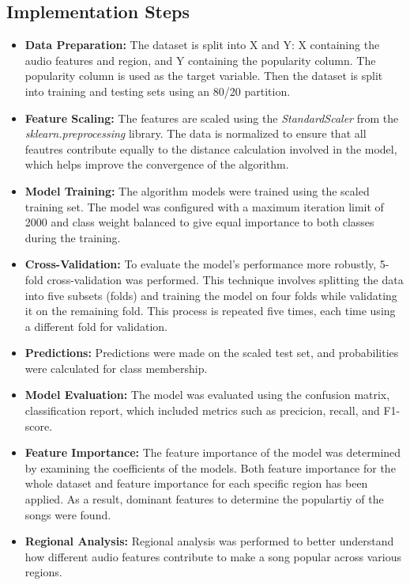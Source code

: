 \subsection{Implementation Steps}
\begin{itemize}
    \item \textbf{Data Preparation: } The dataset is split into X and Y: X containing the audio features and region, and Y containing the popularity column.
    The popularity column is used as the target variable. Then the dataset is split into training and testing sets using an 80/20 partition.
    \item \textbf{Feature Scaling: } The features are scaled using the \textit{StandardScaler} from the \textit{sklearn.preprocessing} library. The data is normalized to ensure that all feautres contribute equally to the distance calculation involved in the model, which helps improve the convergence of the algorithm.
  
    \item \textbf{Model Training: } The algorithm models were trained using the scaled training set. The model was
    configured with a maximum iteration limit of 2000 and class weight balanced to give equal importance to both classes during the training.
    \item \textbf{Cross-Validation: } To evaluate the model's performance more robustly, 5-fold cross-validation was performed.
    This technique involves splitting the data into five subsets (folds) and training the model on four folds while validating it on the remaining
    fold. This process is repeated five times, each time using a different fold for validation.
    \item \textbf{Predictions: } Predictions were made on the scaled test set, and probabilities were calculated for class membership. 
    \item \textbf{Model Evaluation: } The model was evaluated using the confusion matrix, classification report, which included metrics such as precicion, recall, and F1-score.
    \item \textbf{Feature Importance: } The feature importance of the model was determined by examining the coefficients of the models. Both feature importance for the whole dataset and feature importance for each specific region has been applied. As a result, dominant features to determine the populartiy of the songs were found.
    \item \textbf{Regional Analysis: } Regional analysis was performed to better understand how different audio features contribute to make a song popular across various regions.
\end{itemize} 


